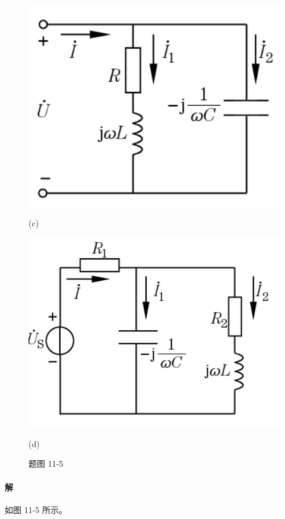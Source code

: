 \documentclass[hyperref, UTF8]{ctexart}
\begin{document}
\begin{figure}[!htb]
\begin{minipage}[t]{0.218\textwidth}
\includegraphics[width=1\textwidth]{p11-5-c.png}
\caption*{(c)}
\end{minipage}
\begin{minipage}[t]{0.251\textwidth}
\centering
\includegraphics[width=1\textwidth]{p11-5-d.png}
\caption*{(d)}
\end{minipage}
\caption*{题图 11-5}
\end{figure}

\paragraph{解}如图 11-5 所示。
\end{document}
